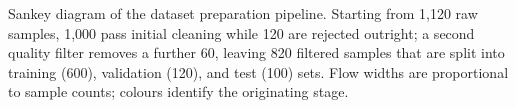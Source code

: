 \caption{Sankey diagram of the dataset preparation pipeline. Starting from 1{,}120 raw samples, 1{,}000 pass initial cleaning while 120 are rejected outright; a second quality filter removes a further 60, leaving 820 filtered samples that are split into training (600), validation (120), and test (100) sets. Flow widths are proportional to sample counts; colours identify the originating stage.}
